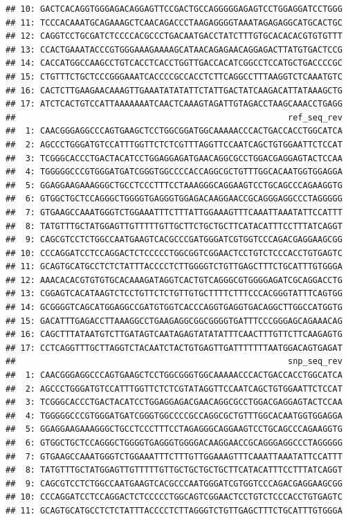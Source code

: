\documentclass[a4paper,10pt]{article}\usepackage[]{graphicx}\usepackage[]{color}
\makeatletter
\newenvironment{kframe}{%
 \def\at@end@of@kframe{}%
 \ifinner\ifhmode%
  \def\at@end@of@kframe{\end{minipage}}%
  \begin{minipage}{\columnwidth}%
 \fi\fi%
 \def\FrameCommand##1{\hskip\@totalleftmargin \hskip-\fboxsep
 \colorbox{shadecolor}{##1}\hskip-\fboxsep
     \hskip-\linewidth \hskip-\@totalleftmargin \hskip\columnwidth}%
 \MakeFramed {\advance\hsize-\width
   \@totalleftmargin\z@ \linewidth\hsize
   \@setminipage}}%
 {\par\unskip\endMakeFramed%
 \at@end@of@kframe}
\newenvironment{knitrout}{}{} %
\makeatother
\begin{document}
\begin{knitrout}
\begin{kframe}
\begin{verbatim}
## 10: GACTCACAGGTGGGAGACAGGAGTTCCGACTGCCAGGGGGAGAGTCCTGGAGGATCCTGGG
## 11: TCCCACAAATGCAGAAAGCTCAACAGACCCTAAGAGGGGTAAATAGAGAGGCATGCACTGC
## 12: CAGGTCCTGCGATCTCCCCACGCCCTGACAATGACCTATCTTTGTGCACACACGTGTGTTT
## 13: CCACTGAAATACCCGTGGGAAAGAAAAGCATAACAGAGAACAGGAGACTTATGTGACTCCG
## 14: CACCATGGCCAAGCCTGTCACCTCACCTGGTTGACCACATCGGCCTCCATGCTGACCCCGC
## 15: CTGTTTCTGCTCCCGGGAAATCACCCCGCCACCTCTTCAGGCCTTTAAGGTCTCAAATGTC
## 16: CACTCTTGAAGAACAAAGTTGAAATATATATTCTATTGACTATCAAGACATTATAAAGCTG
## 17: ATCTCACTGTCCATTAAAAAAATCAACTCAAAGTAGATTGTAGACCTAAGCAAACCTGAGG
##                                                       ref_seq_rev
##  1: CAACGGGAGGCCCAGTGAAGCTCCTGGCGGATGGCAAAAACCCACTGACCACCTGGCATCA
##  2: AGCCCTGGGATGTCCATTTGGTTCTCTCGTTTAGGTTCCAATCAGCTGTGGAATTCTCCAT
##  3: TCGGGCACCCTGACTACATCCTGGAGGAGATGAACAGGCGCCTGGACGAGGAGTACTCCAA
##  4: TGGGGGCCCGTGGGATGATCGGGTGGCCCCACCAGGCGCTGTTTGGCACAATGGTGGAGGA
##  5: GGAGGAAGAAAGGGCTGCCTCCCTTTCCTAAAGGGCAGGAAGTCCTGCAGCCCAGAAGGTG
##  6: GTGGCTGCTCCAGGGCTGGGGTGAGGGTGGAGACAAGGAACCGCAGGGAGGCCCTAGGGGG
##  7: GTGAAGCCAAATGGGTCTGGAAATTTCTTTATTGGAAAGTTTCAAATTAAATATTCCATTT
##  8: TATGTTTGCTATGGAGTTGTTTTTGTTGCTTCTGCTGCTTCATACATTTCCTTTATCAGGT
##  9: CAGCGTCCTCTGGCCAATGAAGTCACGCCCGATGGGATCGTGGTCCCAGACGAGGAAGCGG
## 10: CCCAGGATCCTCCAGGACTCTCCCCCTGGCGGTCGGAACTCCTGTCTCCCACCTGTGAGTC
## 11: GCAGTGCATGCCTCTCTATTTACCCCTCTTGGGGTCTGTTGAGCTTTCTGCATTTGTGGGA
## 12: AAACACACGTGTGTGCACAAAGATAGGTCACTGTCAGGGCGTGGGGAGATCGCAGGACCTG
## 13: CGGAGTCACATAAGTCTCCTGTTCTCTGTTGTGCTTTTCTTTCCCACGGGTATTTCAGTGG
## 14: GCGGGGTCAGCATGGAGGCCGATGTGGTCACCCAGGTGAGGTGACAGGCTTGGCCATGGTG
## 15: GACATTTGAGACCTTAAAGGCCTGAAGAGGCGGCGGGGTGATTTCCCGGGAGCAGAAACAG
## 16: CAGCTTTATAATGTCTTGATAGTCAATAGAGTATATATTTCAACTTTGTTCTTCAAGAGTG
## 17: CCTCAGGTTTGCTTAGGTCTACAATCTACTGTGAGTTGATTTTTTTAATGGACAGTGAGAT
##                                                       snp_seq_rev
##  1: CAACGGGAGGCCCAGTGAAGCTCCTGGCGGGTGGCAAAAACCCACTGACCACCTGGCATCA
##  2: AGCCCTGGGATGTCCATTTGGTTCTCTCGTATAGGTTCCAATCAGCTGTGGAATTCTCCAT
##  3: TCGGGCACCCTGACTACATCCTGGAGGAGACGAACAGGCGCCTGGACGAGGAGTACTCCAA
##  4: TGGGGGCCCGTGGGATGATCGGGTGGCCCCGCCAGGCGCTGTTTGGCACAATGGTGGAGGA
##  5: GGAGGAAGAAAGGGCTGCCTCCCTTTCCTAGAGGGCAGGAAGTCCTGCAGCCCAGAAGGTG
##  6: GTGGCTGCTCCAGGGCTGGGGTGAGGGTGGGGACAAGGAACCGCAGGGAGGCCCTAGGGGG
##  7: GTGAAGCCAAATGGGTCTGGAAATTTCTTTGTTGGAAAGTTTCAAATTAAATATTCCATTT
##  8: TATGTTTGCTATGGAGTTGTTTTTGTTGCTGCTGCTGCTTCATACATTTCCTTTATCAGGT
##  9: CAGCGTCCTCTGGCCAATGAAGTCACGCCCAATGGGATCGTGGTCCCAGACGAGGAAGCGG
## 10: CCCAGGATCCTCCAGGACTCTCCCCCTGGCAGTCGGAACTCCTGTCTCCCACCTGTGAGTC
## 11: GCAGTGCATGCCTCTCTATTTACCCCTCTTAGGGTCTGTTGAGCTTTCTGCATTTGTGGGA

\end{verbatim}
\end{kframe}
\end{knitrout}
\end{document}

